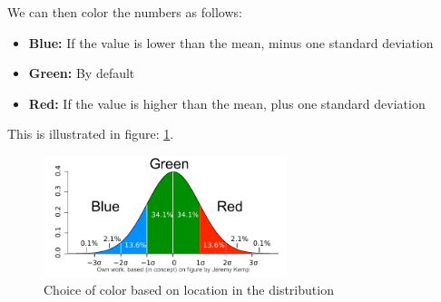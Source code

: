 \documentclass[onecolumn]{article}
\begin{document}
We can then color the numbers as follows:
\begin{itemize}
    \item \textbf{Blue:} If the value is lower than the mean, minus one standard deviation
    \item \textbf{Green:} By default
    \item \textbf{Red:} If the value is higher than the mean, plus one standard deviation
\end{itemize}

This is illustrated in figure: \ref{fig:Standard_deviation_diagram}.
\begin{figure}[H]
  \centering
  \includegraphics[width=200pt]{fig/Standard_deviation_diagram.pdf}
  \caption{Choice of color based on location in the distribution}
  \label{fig:Standard_deviation_diagram}
\end{figure}
\end{document}
